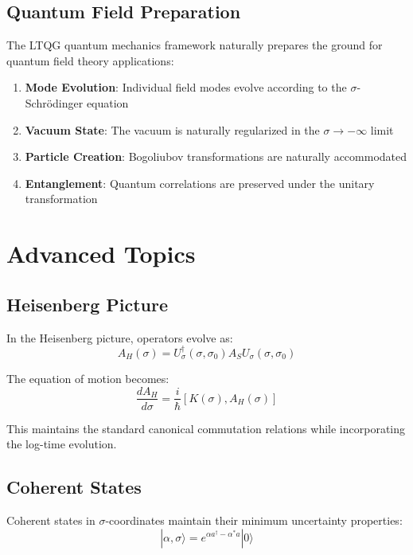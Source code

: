 \documentclass[11pt,a4paper]{article}
\begin{document}
\subsection{Quantum Field Preparation}

The LTQG quantum mechanics framework naturally prepares the ground for quantum field theory applications:

\begin{enumerate}
\item \textbf{Mode Evolution}: Individual field modes evolve according to the $\sigma$-Schrödinger equation
\item \textbf{Vacuum State}: The vacuum is naturally regularized in the $\sigma \to -\infty$ limit
\item \textbf{Particle Creation}: Bogoliubov transformations are naturally accommodated
\item \textbf{Entanglement}: Quantum correlations are preserved under the unitary transformation
\end{enumerate}

\section{Advanced Topics}

\subsection{Heisenberg Picture}

In the Heisenberg picture, operators evolve as:
\begin{equation}
A_H(\sigma) = U_{\sigma}^{\dagger}(\sigma, \sigma_0) A_S U_{\sigma}(\sigma, \sigma_0)
\end{equation}

The equation of motion becomes:
\begin{equation}
\frac{dA_H}{d\sigma} = \frac{i}{\hbar} [K(\sigma), A_H(\sigma)]
\end{equation}

This maintains the standard canonical commutation relations while incorporating the log-time evolution.

\subsection{Coherent States}

Coherent states in $\sigma$-coordinates maintain their minimum uncertainty properties:
\begin{equation}
|\alpha, \sigma\rangle = e^{\alpha a^{\dagger} - \alpha^* a} |0\rangle
\end{equation}
\end{document}
